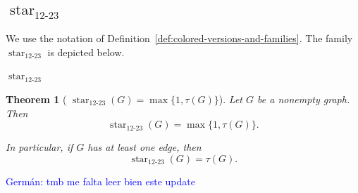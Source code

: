 \documentclass[12pt]{article}
\theoremstyle{plain}
\newtheorem{theorem}{Theorem}[section]
\theoremstyle{definition}
\theoremstyle{remark}
\theoremstyle{definition}
\newcommand{\starlabel}{\mathrm{star}}
\DeclareRobustCommand{\starparam}[1]{%
  \ensuremath{\mathop{\starlabel}\nolimits_{#1}}%
}
\newcommand{\german}[1]{%
  \textcolor{blue}{Germán: #1}%
}
\begin{document}
\subsection{\texorpdfstring{\(\starparam{12\text{-}23}\)}{star12-23}}
\label{subsec:star12-23}

We use the notation of
Definition~\ref{def:colored-versions-and-families}.
The family \(\starparam{12\text{-}23}\) is depicted below.

\begin{center}

\smallskip
\(\starparam{12\text{-}23}\)
\end{center}




\begin{theorem}[
\texorpdfstring{
\(\starparam{12\text{-}23}(G)=\max\{1,\tau(G)\}\)}
{star12-23(G) = max\{1,tau(G)\}}
]
\label{thm:star12-23-vertex-cover}
Let \(G\) be a nonempty graph. Then
\[
\starparam{12\text{-}23}(G)
=
\max\{1,\tau(G)\}.
\]

In particular, if \(G\) has at least one edge, then
\[
\starparam{12\text{-}23}(G)=\tau(G).
\]
\end{theorem}

\german{tmb me falta leer bien este update}
\end{document}
